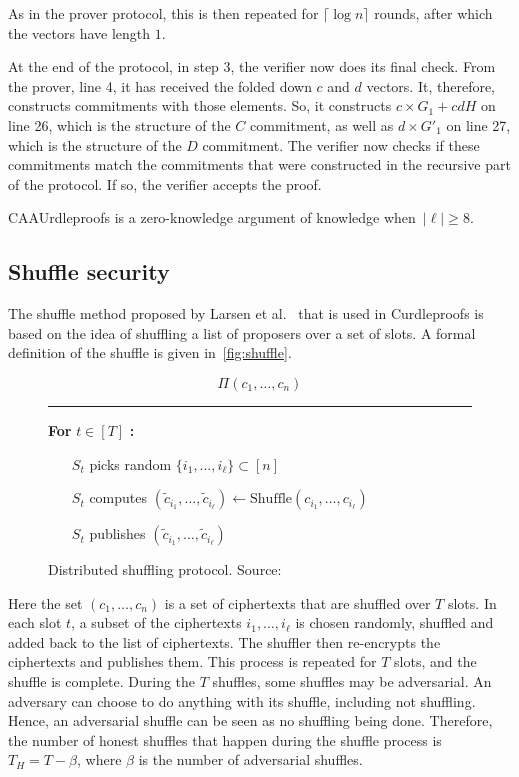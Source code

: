 As in the prover protocol, this is then repeated for $\lceil \log n \rceil$ rounds, after which the vectors have length $1$.

At the end of the protocol, in step 3, the verifier now does its final check.
From the prover, line 4, it has received the folded down $c$ and $d$ vectors.
It, therefore, constructs commitments with those elements.
So, it constructs $c\times G_1+cdH$ on line 26, which is the structure of the $C$ commitment, as well as $d\times G'_1$ on line 27, which is the structure of the $D$ commitment.
The verifier now checks if these commitments match the commitments that were constructed in the recursive part of the protocol.
If so, the verifier accepts the proof.

\begin{theorem}
    CAAUrdleproofs is a zero-knowledge argument of knowledge when~$\left|\ell\right|\geq8$.
\end{theorem}


\subsection{Shuffle security}\label{subsec:approach-shuffle-security}
The shuffle method proposed by Larsen et al.~\cite{cryptoeprint:2022/560} that is used in Curdleproofs is based on the idea of shuffling a list of proposers over a set of slots.
A formal definition of the shuffle is given in~\autoref{fig:shuffle}.

\begin{figure}[!htb]
\begin{framed}
    \[
        \Pi(c_1, \ldots, c_n)
    \]
    \rule{\linewidth}{0.4pt}

    \noindent
    \textbf{For} $t \in [T]$ \textbf{:}
    \begin{itemize}
        \item[$S_t$] picks random $\{i_1, \ldots, i_\ell\} \subset [n]$
        \item[$S_t$] computes $(\tilde{c}_{i_1}, \ldots, \tilde{c}_{i_\ell}) \leftarrow \text{Shuffle}(c_{i_1}, \ldots, c_{i_\ell})$
        \item[$S_t$] publishes $(\tilde{c}_{i_1}, \ldots, \tilde{c}_{i_\ell})$
    \end{itemize}
\end{framed}
\caption{Distributed shuffling protocol. Source:~\cite{cryptoeprint:2022/560}}
\label{fig:shuffle}
\end{figure}

Here the set $(c_1, \ldots, c_n)$ is a set of ciphertexts that are shuffled over $T$ slots.
In each slot $t$, a subset of the ciphertexts ${i_1, \ldots, i_\ell}$ is chosen randomly, shuffled and added back to the list of ciphertexts.
The shuffler then re-encrypts the ciphertexts and publishes them.
This process is repeated for $T$ slots, and the shuffle is complete.
During the $T$ shuffles, some shuffles may be adversarial.
An adversary can choose to do anything with its shuffle, including not shuffling.
Hence, an adversarial shuffle can be seen as no shuffling being done.
Therefore, the number of honest shuffles that happen during the shuffle process is $T_H = T - \beta$, where $\beta$ is the number of adversarial shuffles.

